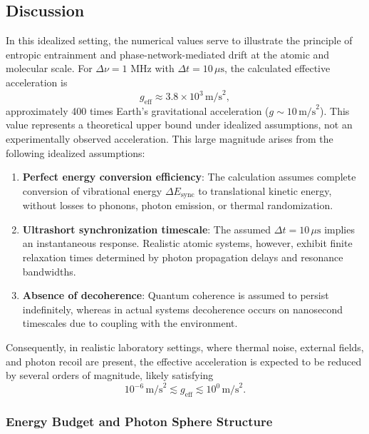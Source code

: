 \documentclass[
 reprint,
 amsmath,amssymb,
 aps,
 prb,
]{revtex4-2}
\numberwithin{equation}{section}
\begin{document}
\subsection{Discussion}

In this idealized setting, the numerical values serve to illustrate the principle of entropic entrainment and phase-network-mediated drift at the atomic and molecular scale. For $\Delta\nu = 1$ MHz with $\Delta t = 10\,\mu\text{s}$, the calculated effective acceleration is
\begin{equation}
g_\text{eff} \approx 3.8 \times 10^3\,\text{m/s}^2,
\end{equation}
approximately 400 times Earth's gravitational acceleration ($g \sim 10\,\text{m/s}^2$). This value represents a theoretical upper bound under idealized assumptions, not an experimentally observed acceleration. This large magnitude arises from the following idealized assumptions:

\begin{enumerate}
\item \textbf{Perfect energy conversion efficiency}: The calculation assumes complete conversion of vibrational energy $\Delta E_\text{sync}$ to translational kinetic energy, without losses to phonons, photon emission, or thermal randomization.

\item \textbf{Ultrashort synchronization timescale}: The assumed $\Delta t = 10\,\mu\text{s}$ implies an instantaneous response. Realistic atomic systems, however, exhibit finite relaxation times determined by photon propagation delays and resonance bandwidths.

\item \textbf{Absence of decoherence}: Quantum coherence is assumed to persist indefinitely, whereas in actual systems decoherence occurs on nanosecond timescales due to coupling with the environment.
\end{enumerate}

Consequently, in realistic laboratory settings, where thermal noise, external fields, and photon recoil \cite{Leibfried2003,Bloch2008,Wineland1998} are present, the effective acceleration is expected to be reduced by several orders of magnitude, likely satisfying
\begin{equation}
10^{-6}\,\text{m/s}^2 \lesssim g_\text{eff} \lesssim 10^{0}\,\text{m/s}^2.
\end{equation}

\subsubsection{Energy Budget and Photon Sphere Structure}
\end{document}

